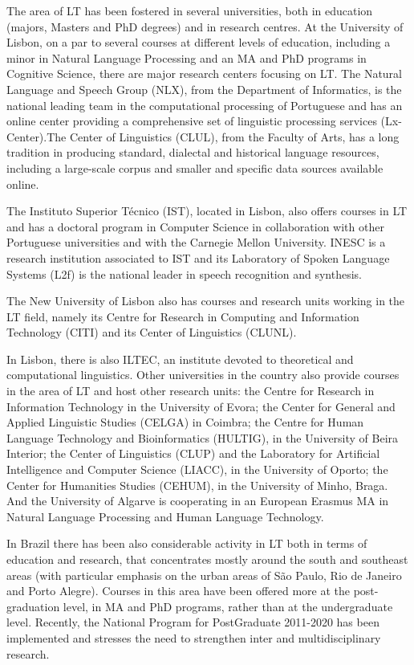 \documentclass[]{../metanetpaper}
\begin{document}
\begin{multicols}{2}
    The area of LT has been fostered in several universities, both in education (majors, Masters and PhD degrees) and in research centres. At the University of Lisbon, on a par to several courses at different levels of education, including a minor in Natural Language Processing and an MA and PhD programs in Cognitive Science, there are major research centers focusing on LT. The Natural Language and Speech Group (NLX), from the Department of Informatics, is the national leading team in the computational processing of Portuguese and has an online center providing a comprehensive set of linguistic processing services (Lx-Center).The Center of Linguistics (CLUL), from the Faculty of Arts, has a long tradition in producing standard, dialectal and historical language resources, including a large-scale corpus and smaller and specific data sources available online. 

The Instituto Superior Técnico (IST), located in Lisbon, also offers courses in LT and has a doctoral program in Computer Science in collaboration with other Portuguese universities and with the Carnegie Mellon University. INESC is a research institution associated to IST and its Laboratory of Spoken Language Systems (L2f) is the national leader in speech recognition and synthesis. 

The New University of Lisbon also has courses and research units working in the LT field, namely its Centre for Research in Computing and Information Technology (CITI) and its Center of Linguistics (CLUNL). 

In Lisbon, there is also ILTEC, an institute devoted to theoretical and computational linguistics. Other universities in the country also provide courses in the area of LT and host other research units: the Centre for Research in Information Technology in the University of Evora; the Center for General and Applied Linguistic Studies (CELGA) in Coimbra; the Centre for Human Language Technology and Bioinformatics (HULTIG), in the University of Beira Interior; the Center of Linguistics (CLUP) and the Laboratory for Artificial Intelligence and Computer Science (LIACC), in the University of Oporto; the Center for Humanities Studies (CEHUM), in the University of Minho, Braga. And the University of Algarve is cooperating in an European Erasmus MA in Natural Language Processing and Human Language Technology.

In Brazil there has been also considerable activity in LT both in terms of education and research, that concentrates mostly around  the south and southeast areas (with particular emphasis on the urban areas of São Paulo, Rio de Janeiro and Porto Alegre). Courses in this area have been offered more at the post-graduation level, in MA and PhD programs, rather than at the undergraduate level. Recently, the National Program for PostGraduate 2011-2020 has been implemented and stresses the need to strengthen inter and multidisciplinary research.


\end{multicols}
\end{document}
